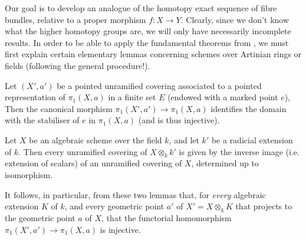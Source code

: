 Our goal is to develop an analogue of the homotopy exact sequence of fibre bundles, relative to a proper morphism $f\colon X\to Y$.
Clearly, since we don't know what the higher homotopy groups are, we will only have necessarily incomplete results.
In order to be able to apply the fundamental theorems from , we must first explain certain elementary lemmas concerning schemes over Artinian rings or fields (following the general procedure!).

\begin{lemma}\label{fga2-lemma-1}
    Let $(X',a')$ be a pointed unramified covering associated to a pointed representation of $\pi_1(X,a)$ in a finite set $E$ (endowed with a marked point $e$),
    Then the canonical morphism $\pi_1(X',a')\to\pi_1(X,a)$ identifies the domain with the stabiliser of $e$ in $\pi_1(X,a)$ (and is thus injective).
\end{lemma}

\begin{lemma}\label{fga2-lemma-2}
    Let $X$ be an algebraic scheme over the field $k$, and let $k'$ be a radicial extension of $k$.
    Then every unramified covering of $X\otimes_kk'$ is given by the inverse image (i.e. extension of scalars) of an unramified covering of $X$, determined up to isomorphism.
\end{lemma}

It follows, in particular, from these two lemmas that, for \emph{every} algebraic extension $K$ of $k$, and every geometric point $a'$ of $X'=X\otimes_kK$ that projects to the geometric point $a$ of $X$, that the functorial homomorphism $\pi_1(X',a')\to\pi_1(X,a)$ is injective.


